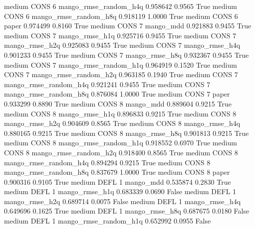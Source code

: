     medium     CONS                 6 mango_rmse_random_h4q   0.958642      0.9565    True
    medium     CONS                 6 mango_rmse_random_h8q   0.918119      1.0000    True
    medium     CONS                 6                 paper   0.974499      0.8160    True
    medium     CONS                 7             mango_mdd   0.921883      0.9455    True
    medium     CONS                 7        mango_rmse_h1q   0.925716      0.9455    True
    medium     CONS                 7        mango_rmse_h2q   0.925083      0.9455    True
    medium     CONS                 7        mango_rmse_h4q   0.901233      0.9455    True
    medium     CONS                 7        mango_rmse_h8q   0.932367      0.9455    True
    medium     CONS                 7 mango_rmse_random_h1q   0.964919      0.1520    True
    medium     CONS                 7 mango_rmse_random_h2q   0.963185      0.1940    True
    medium     CONS                 7 mango_rmse_random_h4q   0.921241      0.9455    True
    medium     CONS                 7 mango_rmse_random_h8q   0.876084      1.0000    True
    medium     CONS                 7                 paper   0.933299      0.8890    True
    medium     CONS                 8             mango_mdd   0.889604      0.9215    True
    medium     CONS                 8        mango_rmse_h1q   0.896833      0.9215    True
    medium     CONS                 8        mango_rmse_h2q   0.904609      0.8565    True
    medium     CONS                 8        mango_rmse_h4q   0.880165      0.9215    True
    medium     CONS                 8        mango_rmse_h8q   0.901813      0.9215    True
    medium     CONS                 8 mango_rmse_random_h1q   0.918552      0.6970    True
    medium     CONS                 8 mango_rmse_random_h2q   0.918400      0.8565    True
    medium     CONS                 8 mango_rmse_random_h4q   0.894294      0.9215    True
    medium     CONS                 8 mango_rmse_random_h8q   0.837679      1.0000    True
    medium     CONS                 8                 paper   0.900316      0.9105    True
    medium     DEFL                 1             mango_mdd   0.535874      0.2830    True
    medium     DEFL                 1        mango_rmse_h1q   0.683339      0.0690   False
    medium     DEFL                 1        mango_rmse_h2q   0.689714      0.0075   False
    medium     DEFL                 1        mango_rmse_h4q   0.649696      0.1625    True
    medium     DEFL                 1        mango_rmse_h8q   0.687675      0.0180   False
    medium     DEFL                 1 mango_rmse_random_h1q   0.652992      0.0955   False
